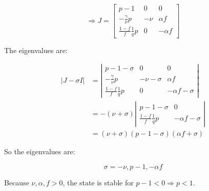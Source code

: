 \[
\Rightarrow J=\left[\begin{array}{ccc}
p-1 & 0 & 0\\
-\frac{\gamma}{\nu}p & -\nu & \alpha f\\
\frac{1-f}{f}\frac{1}{q}p & 0 & -\alpha f
\end{array}\right]
\]

The eigenvalues are:

\begin{align*}
\left|J-\sigma I\right| & =\left|\begin{array}{ccc}
p-1-\sigma & 0 & 0\\
-\frac{\gamma}{\nu}p & -\nu-\sigma & \alpha f\\
\frac{1-f}{f}\frac{1}{q}p & 0 & -\alpha f-\sigma
\end{array}\right|\\
 & =-\left(\nu+\sigma\right)\left|\begin{array}{cc}
p-1-\sigma & 0\\
\frac{1-f}{f}\frac{1}{q}p & -\alpha f-\sigma
\end{array}\right|\\
 & =\left(\nu+\sigma\right)\left(p-1-\sigma\right)\left(\alpha f+\sigma\right)
\end{align*}

So the eigenvalues are:

\[
\sigma=-\nu,p-1,-\alpha f
\]

Because $\nu,\alpha,f>0$, the state is stable for $p-1<0\Rightarrow p<1$.
